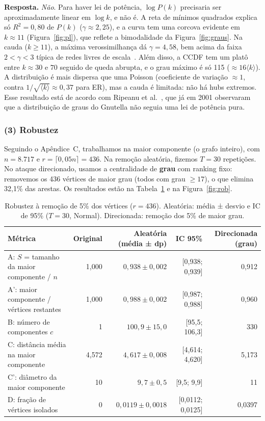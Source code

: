\documentclass[sigconf]{webmedia}
\begin{document}
\textbf{Resposta.} \emph{Não}. Para haver lei de potência, $\log P(k)$ precisaria ser
aproximadamente linear em $\log k$, e não é. A reta de mínimos quadrados explica só
$R^2 = 0{,}80$ de $P(k)$ ($\gamma \approx 2{,}25$), e a curva tem uma corcova
evidente em $k\approx 11$ (Figura~\ref{fig:pl}), que reflete a bimodalidade da
Figura~\ref{fig:graus}. Na cauda ($k\ge 11$), a máxima verossimilhança dá
$\gamma = 4{,}58$, bem acima da faixa $2<\gamma<3$ típica de redes livres de
escala~\cite{barabasi1999}. Além disso, a CCDF tem um platô entre $k\approx 30$ e
$70$ seguido de queda abrupta, e o grau máximo é só 115 ($\approx 16\langle
k\rangle$). A distribuição é mais dispersa que uma Poisson (coeficiente de variação
$\approx 1$, contra $1/\sqrt{\langle k\rangle} \approx 0{,}37$ para ER), mas a
cauda é limitada: não há hubs extremos. Esse resultado está de acordo com
Ripeanu et al.~\cite{ripeanu2002}, que já em 2001 observaram que a distribuição de
graus do Gnutella não seguia uma lei de potência pura.

\subsubsection*{(3) Robustez}
Seguindo o Apêndice~C, trabalhamos na maior componente (o grafo inteiro),
com $n=8.717$ e $r=\lceil 0{,}05n\rceil = 436$. Na remoção aleatória, fizemos
$T=30$ repetições. No ataque direcionado, usamos a centralidade de \textbf{grau}
com ranking fixo: removemos os 436 vértices de maior grau (todos com grau $\ge 17$),
o que elimina 32,1\% das arestas. Os resultados estão na Tabela~\ref{tab:rob} e na
Figura~\ref{fig:rob}.

\begin{table}[t]
\caption{Robustez à remoção de 5\% dos vértices ($r=436$). Aleatória: média ±
desvio e IC de 95\% ($T=30$, Normal). Direcionada: remoção dos 5\% de maior grau.}
\label{tab:rob}
\begin{tabular}{lrrrr}
\toprule
Métrica & Original & Aleatória (média ± dp) & IC 95\% & Direcionada (grau) \\
\midrule
A: $S$ = tamanho da maior componente / $n$ & 1,000 & $0{,}938 \pm 0{,}002$ & [0,938; 0,939] & 0,912 \\
A': maior componente / vértices restantes & 1,000 & $0{,}988 \pm 0{,}002$ & [0,987; 0,988] & 0,960 \\
B: número de componentes $c$ & 1 & $100{,}9 \pm 15{,}0$ & [95,5; 106,3] & 330 \\
C: distância média na maior componente & 4,572 & $4{,}617 \pm 0{,}008$ & [4,614; 4,620] & 5,173 \\
C': diâmetro da maior componente & 10 & $9{,}7 \pm 0{,}5$ & [9,5; 9,9] & 11 \\
D: fração de vértices isolados & 0 & $0{,}0119 \pm 0{,}0018$ & [0,0112; 0,0125] & 0,0397 \\
\bottomrule
\end{tabular}
\end{table}
\end{document}
